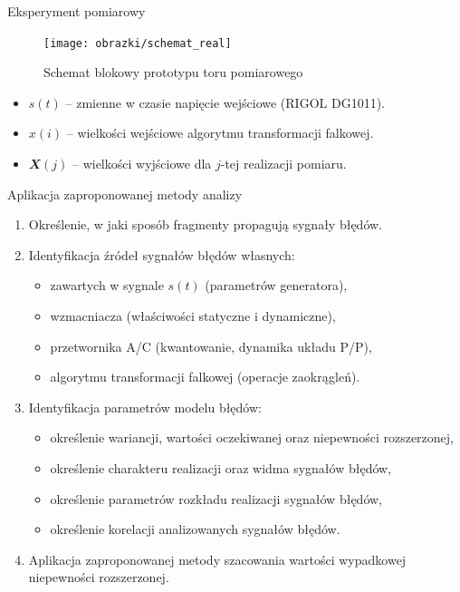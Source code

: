 \documentclass[12pt, polish, aspectratio = 169]{slides}
\begin{document}
\begin{frame}{Eksperyment pomiarowy}
\begin{figure}
\texttt{[image: obrazki/schemat\_real]}
\caption{Schemat blokowy prototypu toru pomiarowego}
\end{figure}
\begin{itemize}
\item $s(t)$ -- zmienne w czasie napięcie wejściowe (RIGOL DG1011).
\item $x(i)$ -- wielkości wejściowe algorytmu transformacji falkowej.
\item $\mathbfit{X}(j)$ -- wielkości wyjściowe dla $j$-tej realizacji pomiaru.
\end{itemize}
\end{frame}

\begin{frame}{Aplikacja zaproponowanej metody analizy}
\begin{enumerate}
\item Określenie, w jaki sposób fragmenty propagują sygnały błędów.
\item Identyfikacja źródeł sygnałów błędów własnych:
	\begin{itemize}
	\item zawartych w sygnale $s(t)$ (parametrów generatora),
	\item wzmacniacza (właściwości statyczne i dynamiczne),
	\item przetwornika A/C (kwantowanie, dynamika układu P/P),
	\item algorytmu transformacji falkowej (operacje zaokrągleń).
	\end{itemize}
\item Identyfikacja parametrów modelu błędów:
	\begin{itemize}
	\item określenie wariancji, wartości oczekiwanej oraz niepewności rozszerzonej,
	\item określenie charakteru realizacji oraz widma sygnałów błędów,
	\item określenie parametrów rozkładu realizacji sygnałów błędów,
	\item określenie korelacji analizowanych sygnałów błędów.
	\end{itemize}
\item Aplikacja zaproponowanej metody szacowania wartości wypadkowej niepewności rozszerzonej.
\end{enumerate}
\end{frame}
\end{document}
